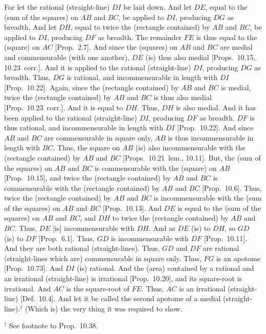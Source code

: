 \begin{Parallel}{}{}
{For let the rational (straight-line) $DI$ be laid down. And let $DE$, equal
to the (sum of the squares) on $AB$ and $BC$, be applied to
$DI$, producing $DG$ as breadth. And let $DH$, equal to twice the
(rectangle contained) by $AB$ and $BC$, be applied to $DI$,
producing $DF$ as breadth. The remainder $FE$ is thus equal to the
(square) on $AC$ [Prop.~2.7]. And since the
(squares) on $AB$ and $BC$ are medial and commensurable (with one another), $DE$ (is) thus also medial [Props.~10.15, 10.23~corr.]. And it is applied to the
rational (straight-line) $DI$, producing $DG$ as breadth. Thus, $DG$
is rational, and incommensurable in length with $DI$ [Prop.~10.22].  Again, since the (rectangle contained)
by $AB$ and $BC$ is medial, twice the (rectangle contained) by $AB$
and $BC$ is thus also medial [Prop.~10.23~corr.]. 
And it is equal to $DH$. Thus, $DH$ is also medial. And it has been
applied to the rational (straight-line) $DI$, producing $DF$ as breadth.
$DF$ is thus rational, and incommensurable in length with $DI$
[Prop.~10.22].  And since $AB$ and $BC$ are commensurable in square only, $AB$ is thus incommensurable in length
with $BC$. Thus, the square on $AB$ (is) also incommensurable
with the (rectangle contained) by $AB$ and $BC$ [Props.~10.21~lem.,
10.11]. But, the (sum of the squares) on $AB$ and $BC$  is commensurable with the (square) on $AB$  [Prop.~10.15], and twice the (rectangle contained)
by $AB$ and $BC$ is commensurable with the (rectangle contained)
by $AB$ and $BC$ [Prop.~10.6]. Thus, twice
the (rectangle contained) by $AB$ and $BC$ is incommensurable
with the (sum of the squares) on $AB$ and $BC$ [Prop.~10.13]. And $DE$ is equal
to the (sum of the squares) on $AB$ and $BC$, and $DH$ to
twice the (rectangle contained) by $AB$ and $BC$. Thus, $DE$
[is] incommensurable with $DH$. And as $DE$ (is) to $DH$, so
$GD$ (is) to $DF$ [Prop.~6.1]. Thus,
$GD$ is incommensurable with $DF$ [Prop.~10.11]. And they are both rational (straight-lines). Thus, $GD$ and $DF$ are rational (straight-lines which are)
commensurable in square only.
Thus, $FG$ is an apotome [Prop.~10.73]. 
And $DI$ (is) rational. And the (area) contained by a rational and
an irrational (straight-line) is irrational [Prop.~10.20], and its square-root 
is irrational. And $AC$ is the square-root of $FE$. Thus, $AC$ is an
irrational (straight-line) [Def.~10.4]. And
let it be called the second apotome of a medial (straight-line).$^\dag$
(Which is) the very thing it
was required to show.}
\end{Parallel}
{\footnotesize\noindent$^\dag$ See footnote to Prop.~10.38.} 

